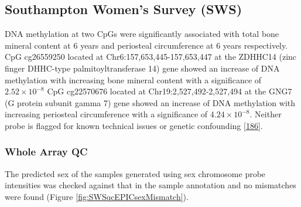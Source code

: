 \documentclass[
]{book}
\begin{document}
\hypertarget{southampton-womens-survey-sws}{%
\subsection{Southampton Women's Survey (SWS)}\label{southampton-womens-survey-sws}}

DNA methylation at two CpGs were significantly associated with total bone mineral content at 6 years and periosteal circumference at 6 years respectively.
CpG cg26559250 located at Chr6:157,653,445-157,653,447 at the ZDHHC14 (zinc finger DHHC-type palmitoyltransferase 14) gene showed an increase of DNA methylation with increasing bone mineral content with a significance of \(2.52\times 10^{-8}\)
CpG cg22570676 located at Chr19:2,527,492-2,527,494 at the GNG7 (G protein subunit gamma 7) gene showed an increase of DNA methylation with increasing periosteal circumference with a significance of \(4.24\times 10^{-8}\).
Neither probe is flagged for known technical issues or genetic confounding {[}\protect\hyperlink{ref-Zhou2017}{186}{]}.

\hypertarget{whole-array-qc-2}{%
\subsubsection{Whole Array QC}\label{whole-array-qc-2}}

The predicted sex of the samples generated using sex chromosome probe intensities was checked against that in the sample annotation and no mismatches were found (Figure \ref{fig:SWSqcEPICsexMismatch}).
\end{document}
